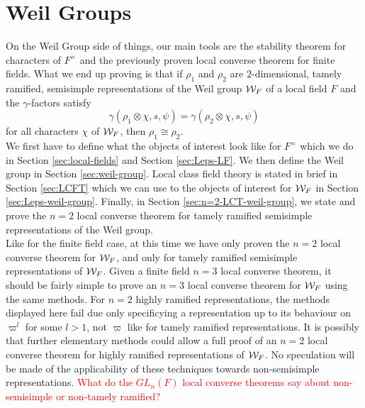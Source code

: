 \section{Weil Groups}
On the Weil Group side of things, our main tools are the stability theorem for characters of $F^\times$ and the previously proven local converse theorem for finite fields.
What we end up proving is that if $\rho_1$ and $\rho_2$ are $2$-dimensional, tamely ramified, semisimple representations of the Weil group $\mathcal{W}_F$ of a local field $F$ and the $\gamma$-factors satisfy
\[\gamma(\rho_1 \otimes \chi, s, \psi) = \gamma(\rho_2 \otimes \chi, s, \psi)\]
for all characters $\chi$ of $\mathcal{W}_F$, then $\rho_1 \cong \rho_2$.
\\

We first have to define what the objects of interest look like for $F^\times$ which we do in Section \ref{sec:local-fields} and Section \ref{sec:Leps-LF}.
We then define the Weil group in Section \ref{sec:weil-group}.
Local class field theory is stated in brief in Section \ref{sec:LCFT} which we can use to the objects of interest for $\mathcal{W}_F$ in Section \ref{sec:Leps-weil-group}.
Finally, in Section \ref{sec:n=2-LCT-weil-group}, we state and prove the $n=2$ local converse theorem for tamely ramified semisimple representations of the Weil group.
\\

Like for the finite field case, at this time we have only proven the $n=2$ local converse theorem for $\mathcal{W}_F$, and only for tamely ramified semisimple representations of $\mathcal{W}_F$.
Given a finite field $n=3$ local converse theorem, it should be fairly simple to prove an $n=3$ local converse theorem for $\mathcal{W}_F$ using the same methods.
For $n=2$ highly ramified representations, the methods displayed here fail due only specificying a representation up to its behaviour on $\varpi^l$ for some $l > 1$, not $\varpi$ like for tamely ramified representations.
It is possibly that further elementary methods could allow a full proof of an $n=2$ local converse theorem for highly ramified representations of $\mathcal{W}_F$.
No speculation will be made of the applicability of these techniques towards non-semisimple representations.
\textcolor{red}{What do the $GL_n(F)$ local converse theorems say about non-semisimple or non-tamely ramified?}
\\
\endinput
